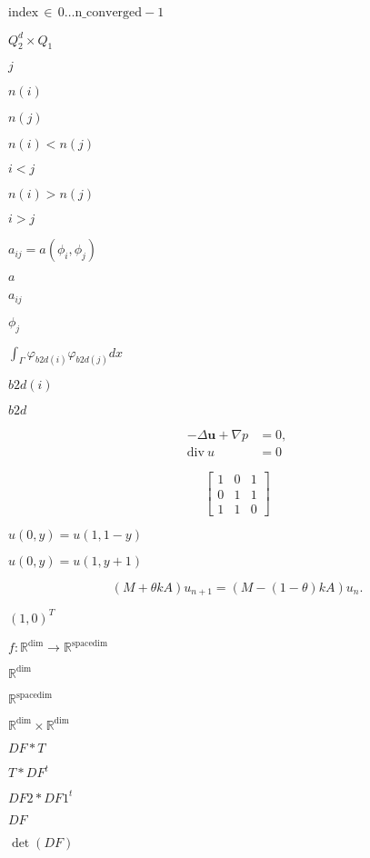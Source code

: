 \documentclass{article}
\begin{document}
$\text{index}\,\in\,0\hdots \text{n\_converged}-1$
\pagebreak

$Q_2^d\times Q_1$
\pagebreak

$j$
\pagebreak

$n(i)$
\pagebreak

$n(j)$
\pagebreak

$n(i)<n(j)$
\pagebreak

$i<j$
\pagebreak

$n(i)>n(j)$
\pagebreak

$i>j$
\pagebreak

$a_{ij} = a(\phi_i, \phi_j)$
\pagebreak

$a$
\pagebreak

$a_{ij}$
\pagebreak

$\phi_j$
\pagebreak

$\int_\Gamma \varphi_{b2d(i)} \varphi_{b2d(j)} dx$
\pagebreak

$b2d(i)$
\pagebreak

$b2d$
\pagebreak

\begin{align*} -\Delta \mathbf u + \nabla p &= 0,\\ \text{div}\ u &= 0 \end{align*}
\pagebreak

\[ \left[ \begin{array}{ccc} 1 & 0 & 1 \\ 0 & 1 & 1 \\ 1 & 1 & 0 \end{array} \right] \]
\pagebreak

$u(0,y)=u(1,1-y)$
\pagebreak

$u(0,y)=u(1,y+1)$
\pagebreak

\[ (M + \theta k A) u_{n+1} = (M - (1-\theta)k A) u_n. \]
\pagebreak

$(1,0)^T$
\pagebreak

$ f: {\mathbb R}^{\text{dim}} \rightarrow {\mathbb R}^{\text{spacedim}}$
\pagebreak

${\mathbb R}^{\text{dim}}$
\pagebreak

${\mathbb R}^{\text{spacedim}}$
\pagebreak

${\mathbb R}^{\text{dim}} \times {\mathbb R}^{\text{dim}}$
\pagebreak

$DF * T$
\pagebreak

$T*DF^{t}$
\pagebreak

$DF2*DF1^{t}$
\pagebreak

$DF$
\pagebreak

$\det(DF)$
\pagebreak
\end{document}
